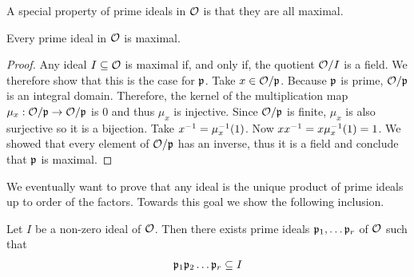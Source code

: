     A special property of prime ideals in \(\mathcal{O}\) is that they are all maximal.
    \begin{proposition}
        \label{Prop: Every Prime Ideal in O is Maximal}
        Every prime ideal in \(\mathcal{O}\) is maximal.
    \end{proposition}
    \begin{proof}
        Any ideal \(I\subseteq \mathcal{O}\) is maximal if, and only if, the quotient \(\mathcal{O}/I\) is a field. We therefore show that this is the case for \(\mathfrak{p}\). Take \(x\in\mathcal{O}/\mathfrak{p}\). Because \(\mathfrak{p}\) is prime, \(\mathcal{O}/\mathfrak{p}\) is an integral domain. Therefore, the kernel of the multiplication map \(\mu_x:\mathcal{O}/\mathfrak{p} \rightarrow \mathcal{O}/\mathfrak{p}\) is 0 and thus \(\mu_x\) is injective. Since \(\mathcal{O}/\mathfrak{p}\) is finite, \(\mu_x\) is also surjective so it is a bijection. Take \(x^{-1} = \mu_x^{-1}(1)\). Now \(xx^{-1} = x\mu_x^{-1}(1) = 1 \). We showed that every element of \(\mathcal{O}/\mathfrak{p}\) has an inverse, thus it is a field and conclude that \(\mathfrak{p}\) is maximal.
    \end{proof}
    We eventually want to prove that any ideal is the unique product of prime ideals up to order of the factors. Towards this goal we show the following inclusion.
    \begin{proposition}
    \label{Prop: Prime Subset of Ideal}
    Let \(I\) be a non-zero ideal of \(\mathcal{O}\). Then there exists prime ideals \(\mathfrak{p}_1,\dots\mathfrak{p}_r\) of \(\mathcal{O}\) such that
        \begin{align*}
            \mathfrak{p}_1\mathfrak{p}_2 \dots\mathfrak{p}_r \subseteq I
        \end{align*}
    \end{proposition}
